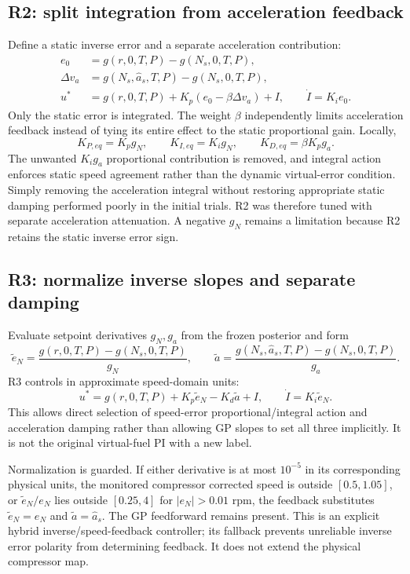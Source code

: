 \subsection{R2: split integration from acceleration feedback}
Define a static inverse error and a separate acceleration contribution:
\begin{align}
e_0&=g(r,0,T,P)-g(N_s,0,T,P),\\
\Delta v_a&=g(N_s,\hat a_s,T,P)-g(N_s,0,T,P),\\
u^*&=g(r,0,T,P)+K_p(e_0-\beta\Delta v_a)+I,\qquad \dot I=K_i e_0.
\end{align}
Only the static error is integrated. The weight $\beta$ independently limits acceleration feedback instead of tying its entire effect to the static proportional gain. Locally,
\begin{equation}
K_{P,eq}=K_pg_N,\qquad K_{I,eq}=K_ig_N,\qquad K_{D,eq}=\beta K_pg_a.
\end{equation}
The unwanted $K_i g_a$ proportional contribution is removed, and integral action enforces static speed agreement rather than the dynamic virtual-error condition. Simply removing the acceleration integral without restoring appropriate static damping performed poorly in the initial trials. R2 was therefore tuned with separate acceleration attenuation. A negative $g_N$ remains a limitation because R2 retains the static inverse error sign.

\subsection{R3: normalize inverse slopes and separate damping}
Evaluate setpoint derivatives $g_N,g_a$ from the frozen posterior and form
\begin{equation}
\tilde e_N=\frac{g(r,0,T,P)-g(N_s,0,T,P)}{g_N},\qquad
\tilde a=\frac{g(N_s,\hat a_s,T,P)-g(N_s,0,T,P)}{g_a}.
\end{equation}
R3 controls in approximate speed-domain units:
\begin{equation}
u^*=g(r,0,T,P)+K_p\tilde e_N-K_d\tilde a+I,\qquad \dot I=K_i\tilde e_N.
\end{equation}
This allows direct selection of speed-error proportional/integral action and acceleration damping rather than allowing GP slopes to set all three implicitly. It is not the original virtual-fuel PI with a new label.

Normalization is guarded. If either derivative is at most $10^{-5}$ in its corresponding physical units, the monitored compressor corrected speed is outside $[0.5,1.05]$, or $\tilde e_N/e_N$ lies outside $[0.25,4]$ for $|e_N|>0.01$ rpm, the feedback substitutes $\tilde e_N=e_N$ and $\tilde a=\hat a_s$. The GP feedforward remains present. This is an explicit hybrid inverse/speed-feedback controller; its fallback prevents unreliable inverse error polarity from determining feedback. It does not extend the physical compressor map.

